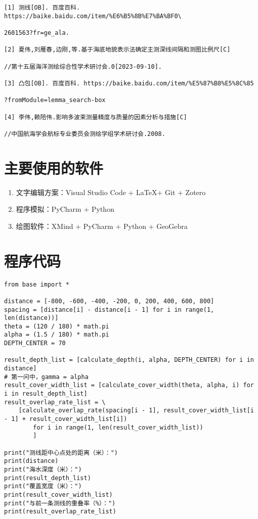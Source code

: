 

\begin{verbatim}
[1] 测线[OB]. 百度百科. https://baike.baidu.com/item/%E6%B5%8B%E7%BA%BF0\

2601563?fr=ge_ala.

[2] 夏伟,刘雁春,边刚,等.基于海底地貌表示法确定主测深线间隔和测图比例尺[C]

//第十五届海洋测绘综合性学术研讨会.0[2023-09-10].

[3] 凸包[OB]. 百度百科. https://baike.baidu.com/item/%E5%87%B8%E5%8C%85

?fromModule=lemma_search-box

[4] 李伟,赖陪伟.影响多波束测量精度与质量的因素分析与措施[C]

//中国航海学会航标专业委员会测绘学组学术研讨会.2008.

\end{verbatim}


\appendix
\section{主要使用的软件}

\begin{enumerate}
    \item 文字编辑方案：Visual Studio Code + \LaTeX + Git + Zotero
    \item 程序模拟：PyCharm + Python
    \item 绘图软件：XMind + PyCharm + Python + GeoGebra
\end{enumerate}

\section{程序代码}

\begin{lstlisting}[caption={question1.py}]
from base import *

distance = [-800, -600, -400, -200, 0, 200, 400, 600, 800]
spacing = [distance[i] - distance[i - 1] for i in range(1, len(distance))]
theta = (120 / 180) * math.pi
alpha = (1.5 / 180) * math.pi
DEPTH_CENTER = 70

result_depth_list = [calculate_depth(i, alpha, DEPTH_CENTER) for i in distance]
# 第一问中，gamma = alpha
result_cover_width_list = [calculate_cover_width(theta, alpha, i) for i in result_depth_list]
result_overlap_rate_list = \
    [calculate_overlap_rate(spacing[i - 1], result_cover_width_list[i - 1] + result_cover_width_list[i])
        for i in range(1, len(result_cover_width_list))
        ]

print("测线距中心点处的距离（米）：")
print(distance)
print("海水深度（米）：")
print(result_depth_list)
print("覆盖宽度（米）：")
print(result_cover_width_list)
print("与前一条测线的重叠率（%）：")
print(result_overlap_rate_list)
\end{lstlisting}

